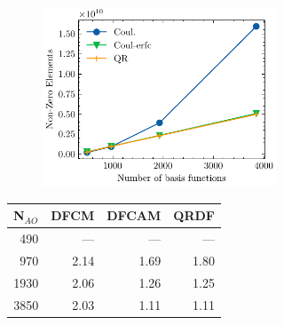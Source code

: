 \begin{figure}[htp]

\begin{subfigure}{\textwidth}
\begin{subfigure}{0.45\textwidth}
\includegraphics[width=\textwidth]{Pics/ftmp2_nze_alkan}
\end{subfigure}
\hfill
\begin{subtable}{0.45\textwidth}
\begin{tabular}{rrrr}
\hline
N$_{AO}$ & DFCM & DFCAM & QRDF \\ \hline
490 & --- & --- 	& --- \\ 
970	& 2.14 & 1.69 & 1.80 \\
1930	 & 2.06 & 1.26 & 1.25 \\
3850	 & 2.03 & 1.11 & 1.11 \\
 \hline
\end{tabular}
\end{subtable}
\caption{}
\label{fig:GS_ZMEM_LA}
\end{subfigure}

\vspace{1.5\baselineskip}


\end{figure}
